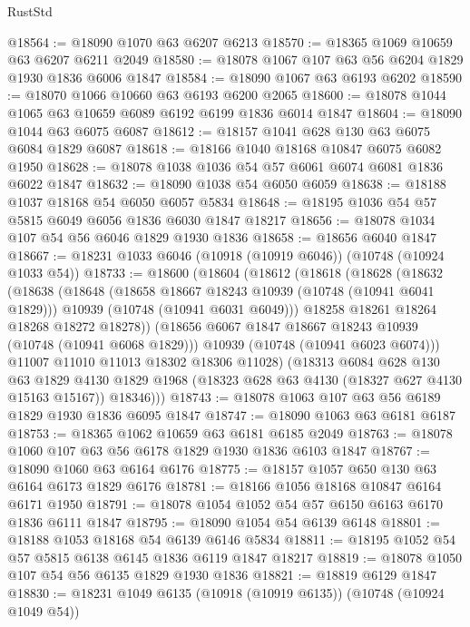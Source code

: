 \begin{lexlean}{RustStd}
\begin{coremodule}
@18564 := @18090 @1070 @63 @6207 @6213
@18570 := @18365 @1069 @10659 @63 @6207 @6211 @2049
@18580 := @18078 @1067 @107 @63 @56 @6204 @1829 @1930 @1836 @6006 @1847
@18584 := @18090 @1067 @63 @6193 @6202
@18590 := @18070 @1066 @10660 @63 @6193 @6200 @2065
@18600 := @18078 @1044 @1065 @63 @10659 @6089 @6192 @6199 @1836 @6014 @1847
@18604 := @18090 @1044 @63 @6075 @6087
@18612 := @18157 @1041 @628 @130 @63 @6075 @6084 @1829 @6087
@18618 := @18166 @1040 @18168 @10847 @6075 @6082 @1950
@18628 := @18078 @1038 @1036 @54 @57 @6061 @6074 @6081 @1836 @6022 @1847
@18632 := @18090 @1038 @54 @6050 @6059
@18638 := @18188 @1037 @18168 @54 @6050 @6057 @5834
@18648 := @18195 @1036 @54 @57 @5815 @6049 @6056 @1836 @6030 @1847 @18217
@18656 := @18078 @1034 @107 @54 @56 @6046 @1829 @1930 @1836
@18658 := @18656 @6040 @1847
@18667 := @18231 @1033 @6046 (@10918 (@10919 @6046)) (@10748 (@10924 @1033 @54))
@18733 := @18600
    (@18604
      (@18612
        (@18618
          (@18628
            (@18632
              (@18638
                (@18648
                  (@18658 @18667 @18243 @10939 (@10748 (@10941 @6041 @1829)))
                  @10939
                  (@10748 (@10941 @6031 @6049)))
                @18258
                @18261
                @18264
                @18268
                @18272
                @18278))
            (@18656 @6067 @1847 @18667 @18243 @10939 (@10748 (@10941 @6068 @1829)))
            @10939
            (@10748 (@10941 @6023 @6074)))
          @11007
          @11010
          @11013
          @18302
          @18306
          @11028)
        (@18313
          @6084
          @628
          @130
          @63
          @1829
          @4130
          @1829
          @1968
          (@18323 @628 @63 @4130 (@18327 @627 @4130 @15163 @15167))
          @18346)))
@18743 := @18078 @1063 @107 @63 @56 @6189 @1829 @1930 @1836 @6095 @1847
@18747 := @18090 @1063 @63 @6181 @6187
@18753 := @18365 @1062 @10659 @63 @6181 @6185 @2049
@18763 := @18078 @1060 @107 @63 @56 @6178 @1829 @1930 @1836 @6103 @1847
@18767 := @18090 @1060 @63 @6164 @6176
@18775 := @18157 @1057 @650 @130 @63 @6164 @6173 @1829 @6176
@18781 := @18166 @1056 @18168 @10847 @6164 @6171 @1950
@18791 := @18078 @1054 @1052 @54 @57 @6150 @6163 @6170 @1836 @6111 @1847
@18795 := @18090 @1054 @54 @6139 @6148
@18801 := @18188 @1053 @18168 @54 @6139 @6146 @5834
@18811 := @18195 @1052 @54 @57 @5815 @6138 @6145 @1836 @6119 @1847 @18217
@18819 := @18078 @1050 @107 @54 @56 @6135 @1829 @1930 @1836
@18821 := @18819 @6129 @1847
@18830 := @18231 @1049 @6135 (@10918 (@10919 @6135)) (@10748 (@10924 @1049 @54))

\end{coremodule}
\end{lexlean}
